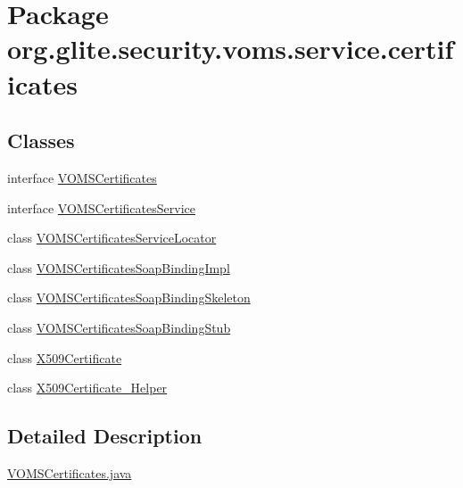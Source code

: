 \hypertarget{namespaceorg_1_1glite_1_1security_1_1voms_1_1service_1_1certificates}{
\section{Package org.glite.security.voms.service.certificates}
\label{namespaceorg_1_1glite_1_1security_1_1voms_1_1service_1_1certificates}
}
\subsection*{Classes}
\begin{DoxyCompactItemize}
\item 
interface \hyperlink{interfaceorg_1_1glite_1_1security_1_1voms_1_1service_1_1certificates_1_1VOMSCertificates}{VOMSCertificates}
\item 
interface \hyperlink{interfaceorg_1_1glite_1_1security_1_1voms_1_1service_1_1certificates_1_1VOMSCertificatesService}{VOMSCertificatesService}
\item 
class \hyperlink{classorg_1_1glite_1_1security_1_1voms_1_1service_1_1certificates_1_1VOMSCertificatesServiceLocator}{VOMSCertificatesServiceLocator}
\item 
class \hyperlink{classorg_1_1glite_1_1security_1_1voms_1_1service_1_1certificates_1_1VOMSCertificatesSoapBindingImpl}{VOMSCertificatesSoapBindingImpl}
\item 
class \hyperlink{classorg_1_1glite_1_1security_1_1voms_1_1service_1_1certificates_1_1VOMSCertificatesSoapBindingSkeleton}{VOMSCertificatesSoapBindingSkeleton}
\item 
class \hyperlink{classorg_1_1glite_1_1security_1_1voms_1_1service_1_1certificates_1_1VOMSCertificatesSoapBindingStub}{VOMSCertificatesSoapBindingStub}
\item 
class \hyperlink{classorg_1_1glite_1_1security_1_1voms_1_1service_1_1certificates_1_1X509Certificate}{X509Certificate}
\item 
class \hyperlink{classorg_1_1glite_1_1security_1_1voms_1_1service_1_1certificates_1_1X509Certificate__Helper}{X509Certificate\_\-Helper}
\end{DoxyCompactItemize}


\subsection{Detailed Description}
\hyperlink{VOMSCertificates_8java}{VOMSCertificates.java}

